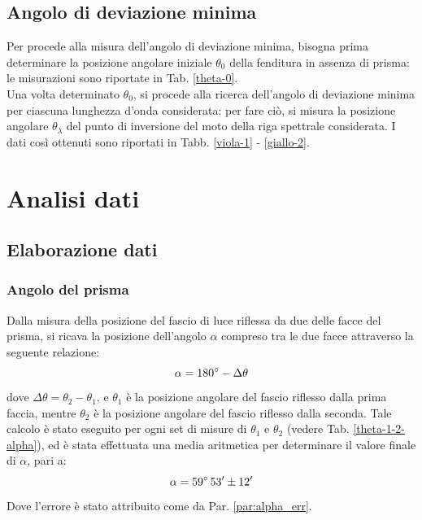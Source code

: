 \documentclass[]{article}
\let\oldsection\section%
\renewcommand{\section}{%
	\renewcommand{\theequation}{\thesection.\arabic{equation}}%
	\oldsection}%
\let\oldsubsection\subsection%
\renewcommand{\subsection}{%
	\renewcommand{\theequation}{\thesubsection.\arabic{equation}}%
	\oldsubsection}%
\begin{document}
    \subsection{Angolo di deviazione minima}
    Per procede alla misura dell'angolo di deviazione minima, bisogna prima determinare la posizione angolare iniziale $\theta_0$ della fenditura in assenza di prisma: le misurazioni sono riportate in Tab. \ref{theta-0}. \\
    Una volta determinato $\theta_0$, si procede alla ricerca dell'angolo di deviazione minima per ciascuna lunghezza d'onda considerata: per fare ciò, si misura la posizione angolare $\theta_{\lambda}$ del punto di inversione del moto della riga spettrale considerata. I dati così ottenuti sono riportati in Tabb. \ref{viola-1} - \ref{giallo-2}.

    \section{Analisi dati}
    \subsection{Elaborazione dati}
    \subsubsection{Angolo del prisma}
    Dalla misura della posizione del fascio di luce riflessa da due delle facce del prisma, si ricava la posizione dell'angolo $\alpha$ compreso tra le due facce attraverso la seguente relazione:
    \begin{equation}
        \label{alpha}
        \alpha = 180\degree - \Delta\theta
    \end{equation}
    dove $\Delta\theta=\theta_2-\theta_1$, e $\theta_1$ è la posizione angolare del fascio riflesso dalla prima faccia, mentre $\theta_2$ è la posizione angolare del fascio riflesso dalla seconda.
    Tale calcolo è stato eseguito per ogni set di misure di $\theta_1$ e $\theta_2$ (vedere Tab. \ref{theta-1-2-alpha}), ed è stata effettuata una media aritmetica per determinare il valore finale di $\alpha$, pari a: 
    \begin{equation}
        \label{alpha-value}
        \alpha = 59 \degree \, 53' \pm 12'
    \end{equation}
    Dove l'errore è stato attribuito come da Par. \ref{par:alpha_err}.
\end{document}
